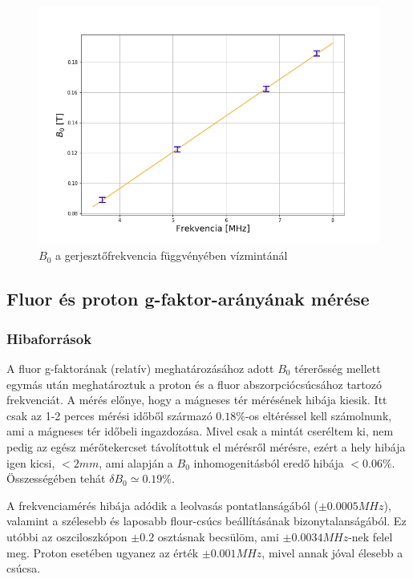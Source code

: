 \documentclass[a4paper,12pt]{article}
\begin{document}
\begin{figure}[h]
\centering
    \begin{minipage}{1\textwidth}
        \centering
        \includegraphics[width=1\linewidth]{BF.png}
    \end{minipage}
    \caption{$B_0$ a gerjesztőfrekvencia függvényében vízmintánál}
    \label{fig:BF}
\end{figure}

\subsection{Fluor és proton g-faktor-arányának mérése}
\subsubsection{Hibaforrások}
A fluor g-faktorának (relatív) meghatározásához adott $B_0$ térerősség mellett egymás után meghatároztuk a proton és a fluor abszorpciócsúcsához tartozó frekvenciát. A mérés előnye, hogy a mágneses tér mérésének hibája kiesik. Itt csak az 1-2 perces mérési időből származó $0.18\%$-os eltéréssel kell számolnunk, ami a mágneses tér időbeli ingazdozása. Mivel csak a mintát cseréltem ki, nem pedig az egész mérőtekercset távolítottuk el mérésről mérésre, ezért a hely hibája igen kicsi, $<2mm$, ami alapján a $B_0$ inhomogenitásból eredő hibája $<0.06\%$. Összességében tehát $\delta B_0 \simeq 0.19\%$.

A frekvenciamérés hibája adódik a leolvasás pontatlanságából ($\pm0.0005MHz$), valamint a szélesebb és laposabb flour-csúcs beállításának bizonytalanságából. Ez utóbbi az oszciloszkópon $\pm0.2$ osztásnak becsülöm, ami $\pm 0.0034MHz$-nek felel meg. Proton esetében ugyanez az érték $\pm 0.001MHz$, mivel annak jóval élesebb a csúcsa.
\end{document}
